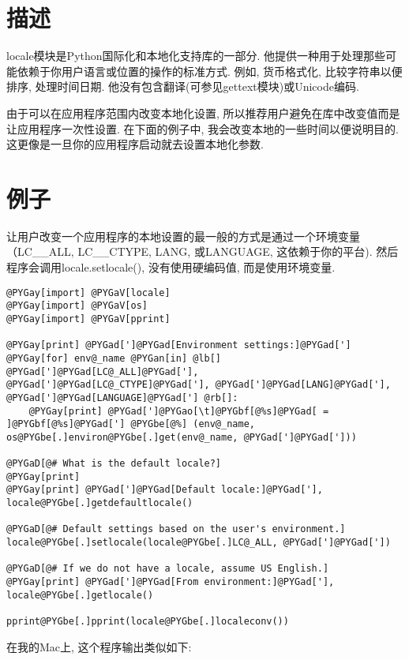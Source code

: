 \documentclass[a4paper,10pt,english]{manual}
\begin{document}
\section{描述}

locale模块是Python国际化和本地化支持库的一部分. 他提供一种用于处理那些可能依赖于你用户语言或位置的操作的标准方式. 例如, 货币格式化, 比较字符串以便排序, 处理时间日期. 他没有包含翻译(可参见gettext模块)或Unicode编码.

由于可以在应用程序范围内改变本地化设置, 所以推荐用户避免在库中改变值而是让应用程序一次性设置. 在下面的例子中, 我会改变本地的一些时间以便说明目的.这更像是一旦你的应用程序启动就去设置本地化参数.


\section{例子}

让用户改变一个应用程序的本地设置的最一般的方式是通过一个环境变量（LC\_\_ALL, LC\_\_CTYPE, LANG, 或LANGUAGE, 这依赖于你的平台). 然后程序会调用locale.setlocale(), 没有使用硬编码值, 而是使用环境变量.

\begin{Verbatim}[commandchars=@\[\]]
@PYGay[import] @PYGaV[locale]
@PYGay[import] @PYGaV[os]
@PYGay[import] @PYGaV[pprint]

@PYGay[print] @PYGad[']@PYGad[Environment settings:]@PYGad[']
@PYGay[for] env@_name @PYGan[in] @lb[] @PYGad[']@PYGad[LC@_ALL]@PYGad['], @PYGad[']@PYGad[LC@_CTYPE]@PYGad['], @PYGad[']@PYGad[LANG]@PYGad['], @PYGad[']@PYGad[LANGUAGE]@PYGad['] @rb[]:
    @PYGay[print] @PYGad[']@PYGao[\t]@PYGbf[@%s]@PYGad[ = ]@PYGbf[@%s]@PYGad['] @PYGbe[@%] (env@_name, os@PYGbe[.]environ@PYGbe[.]get(env@_name, @PYGad[']@PYGad[']))

@PYGaD[@# What is the default locale?]
@PYGay[print]
@PYGay[print] @PYGad[']@PYGad[Default locale:]@PYGad['], locale@PYGbe[.]getdefaultlocale()

@PYGaD[@# Default settings based on the user's environment.]
locale@PYGbe[.]setlocale(locale@PYGbe[.]LC@_ALL, @PYGad[']@PYGad['])

@PYGaD[@# If we do not have a locale, assume US English.]
@PYGay[print] @PYGad[']@PYGad[From environment:]@PYGad['], locale@PYGbe[.]getlocale()

pprint@PYGbe[.]pprint(locale@PYGbe[.]localeconv())
\end{Verbatim}

在我的Mac上, 这个程序输出类似如下:
\end{document}
